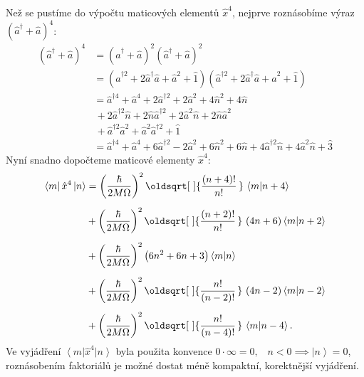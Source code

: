 \documentclass[10pt,a4paper]{article}
\renewcommand*{\sqrt}[2][\ ]{\oldsqrt[#1]{#2\,}\,}
\newcommand{\bra}[1]{\left< #1 \right|}
\newcommand{\ket}[1]{\left| #1 \right>}
\newcommand{\braket}[2]{\left< #1 \middle| #2 \right>}
\begin{document}
Než se pustíme do výpočtu maticových elementů $\hat{x}^4$, nejprve roznásobíme výraz $(\hat{a}^\dagger + \hat{a})^4$:
\begin{align*}
    \left( \hat{a}^\dagger + \hat{a} \right)^4
    &= \left( \hat{a}^\dagger + \hat{a} \right)^2 \left( \hat{a}^\dagger + \hat{a} \right)^2
    \\[5pt]
    &= \left( \hat{a}^{\dagger 2} + 2 \hat{a}^\dagger \hat{a} + \hat{a}^2+ \hat{1} \right) \left( \hat{a}^{\dagger 2} + 2 \hat{a}^\dagger \hat{a} + \hat{a}^2+ \hat{1} \right)
    \\[5pt]
    &= \hat{a}^{\dagger 4} + \hat{a}^4 + 2\hat{a}^{\dagger 2} + 2\hat{a}^2 + 4\hat{n}^2 + 4\hat{n} \\
    &\,+ 2\hat{a}^{\dagger 2} \hat{n} + 2\hat{n} \hat{a}^{\dagger 2} + 2\hat{a}^2 \hat{n} + 2\hat{n} \hat{a}^2 \\
    &\,+ \hat{a}^{\dagger 2} \hat{a}^2 + \hat{a}^2 \hat{a}^{\dagger 2} + \hat{1}
    \\[5pt]
    &= \hat{a}^{\dagger 4} + \hat{a}^4 + 6\hat{a}^{\dagger 2} - 2\hat{a}^2 + 6\hat{n}^2 + 6\hat{n} + 4\hat{a}^{\dagger 2} \hat{n} + 4\hat{a}^2 \hat{n} + \hat{3}
\end{align*}
Nyní snadno dopočteme maticové elementy $\hat{x}^4$:
\begin{align*}
    \bra{m} \hat{x}^4 \ket{n}
    &= \left( \frac{\hbar}{2 M \Omega} \right)^2 \sqrt{\frac{\left(n + 4\right)!}{n!}} \braket{m}{n + 4 } \\[5pt]
    &+ \left( \frac{\hbar}{2 M \Omega} \right)^2 \sqrt{\frac{\left(n + 2\right)!}{n!}} \left(4 n + 6\right) \braket{m}{n + 2} \\[5pt]
    &+ \left( \frac{\hbar}{2 M \Omega} \right)^2 \left(6 n^{2} + 6 n + 3\right) \braket{m}{n} \\[5pt]
    &+ \left( \frac{\hbar}{2 M \Omega} \right)^2 \sqrt{\frac{n!}{\left(n - 2\right)!}} \left(4 n - 2\right) \braket{m}{n - 2} \\[5pt]
    &+ \left( \frac{\hbar}{2 M \Omega} \right)^2 \sqrt{\frac{n!}{\left(n - 4\right)!}} \braket{m}{n - 4}.
\end{align*}
Ve vyjádření $\bra{m} \hat{x}^4 \ket{n}$ byla použita konvence $0\cdot\infty = 0, \;\;\; n<0 \implies \ket{n} = 0$, roznásobením faktoriálů je možné dostat méně kompaktní, korektnější vyjádření.
\end{document}
